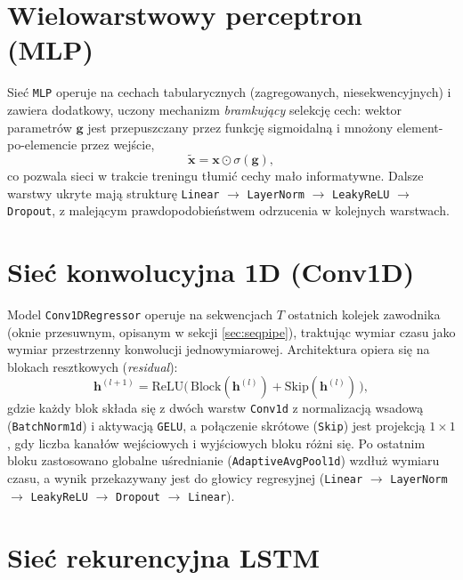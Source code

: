 \documentclass[a4paper,twoside,11pt]{mwrep}
\theoremstyle{plain} \newtheorem{thm}{Twierdzenie}
\theoremstyle{plain} \newtheorem{lem}{Lemat}
\theoremstyle{definition} \newtheorem{defn}{Definicja}
\theoremstyle{remark} \newtheorem*{rem}{Wniosek}
\begin{document}
\section{Wielowarstwowy perceptron (MLP)}

Sieć \texttt{MLP} operuje na cechach tabularycznych (zagregowanych,
niesekwencyjnych) i zawiera dodatkowy, uczony mechanizm \emph{bramkujący}
selekcję cech: wektor parametrów $\mathbf{g}$ jest przepuszczany przez
funkcję sigmoidalną i mnożony element-po-elemencie przez wejście,
\begin{equation}
    \tilde{\mathbf{x}} = \mathbf{x} \odot \sigma(\mathbf{g}),
\end{equation}
co pozwala sieci w trakcie treningu tłumić cechy mało informatywne. Dalsze
warstwy ukryte mają strukturę
\texttt{Linear} $\rightarrow$ \texttt{LayerNorm} $\rightarrow$
\texttt{LeakyReLU} $\rightarrow$ \texttt{Dropout}, z malejącym
prawdopodobieństwem odrzucenia w kolejnych warstwach.

\section{Sieć konwolucyjna 1D (Conv1D)}

Model \texttt{Conv1DRegressor} operuje na sekwencjach $T$ ostatnich
kolejek zawodnika (oknie przesuwnym, opisanym w sekcji
\ref{sec:seqpipe}), traktując wymiar czasu jako wymiar przestrzenny
konwolucji jednowymiarowej. Architektura opiera się na blokach
resztkowych (\emph{residual}):
\begin{equation}
    \mathbf{h}^{(l+1)} = \text{ReLU}\big(\,\text{Block}(\mathbf{h}^{(l)}) + \text{Skip}(\mathbf{h}^{(l)})\,\big),
\end{equation}
gdzie każdy blok składa się z dwóch warstw \texttt{Conv1d} z
normalizacją wsadową (\texttt{BatchNorm1d}) i aktywacją \texttt{GELU}, a
połączenie skrótowe (\texttt{Skip}) jest projekcją $1\times1$, gdy liczba
kanałów wejściowych i wyjściowych bloku różni się. Po ostatnim bloku
zastosowano globalne uśrednianie (\texttt{AdaptiveAvgPool1d}) wzdłuż
wymiaru czasu, a wynik przekazywany jest do głowicy regresyjnej
(\texttt{Linear} $\rightarrow$ \texttt{LayerNorm} $\rightarrow$
\texttt{LeakyReLU} $\rightarrow$ \texttt{Dropout} $\rightarrow$
\texttt{Linear}).

\section{Sieć rekurencyjna LSTM}
\end{document}
